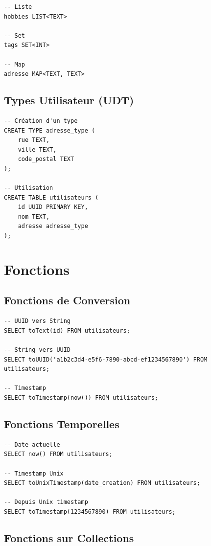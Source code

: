 \documentclass[11pt,a4paper]{article}
\begin{document}
\begin{lstlisting}
-- Liste
hobbies LIST<TEXT>

-- Set
tags SET<INT>

-- Map
adresse MAP<TEXT, TEXT>
\end{lstlisting}

\subsection{Types Utilisateur (UDT)}

\begin{lstlisting}
-- Création d'un type
CREATE TYPE adresse_type (
    rue TEXT,
    ville TEXT,
    code_postal TEXT
);

-- Utilisation
CREATE TABLE utilisateurs (
    id UUID PRIMARY KEY,
    nom TEXT,
    adresse adresse_type
);
\end{lstlisting}

\newpage

\section{Fonctions}

\subsection{Fonctions de Conversion}

\begin{lstlisting}
-- UUID vers String
SELECT toText(id) FROM utilisateurs;

-- String vers UUID
SELECT toUUID('a1b2c3d4-e5f6-7890-abcd-ef1234567890') FROM utilisateurs;

-- Timestamp
SELECT toTimestamp(now()) FROM utilisateurs;
\end{lstlisting}

\subsection{Fonctions Temporelles}

\begin{lstlisting}
-- Date actuelle
SELECT now() FROM utilisateurs;

-- Timestamp Unix
SELECT toUnixTimestamp(date_creation) FROM utilisateurs;

-- Depuis Unix timestamp
SELECT toTimestamp(1234567890) FROM utilisateurs;
\end{lstlisting}

\subsection{Fonctions sur Collections}
\end{document}

